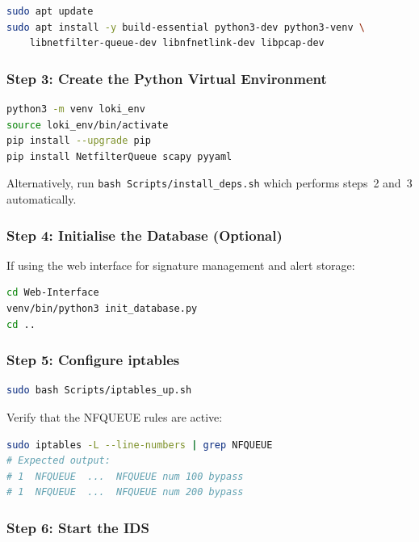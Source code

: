 \documentclass[12pt,a4paper]{article}
\begin{document}
\begin{lstlisting}[language=bash]
sudo apt update
sudo apt install -y build-essential python3-dev python3-venv \
    libnetfilter-queue-dev libnfnetlink-dev libpcap-dev
\end{lstlisting}

\subsubsection*{Step 3: Create the Python Virtual Environment}

\begin{lstlisting}[language=bash]
python3 -m venv loki_env
source loki_env/bin/activate
pip install --upgrade pip
pip install NetfilterQueue scapy pyyaml
\end{lstlisting}

Alternatively, run \texttt{bash Scripts/install\_deps.sh} which performs steps~2 and~3 automatically.

\subsubsection*{Step 4: Initialise the Database (Optional)}

If using the web interface for signature management and alert storage:

\begin{lstlisting}[language=bash]
cd Web-Interface
venv/bin/python3 init_database.py
cd ..
\end{lstlisting}

\subsubsection*{Step 5: Configure iptables}

\begin{lstlisting}[language=bash]
sudo bash Scripts/iptables_up.sh
\end{lstlisting}

Verify that the NFQUEUE rules are active:

\begin{lstlisting}[language=bash]
sudo iptables -L --line-numbers | grep NFQUEUE
# Expected output:
# 1  NFQUEUE  ...  NFQUEUE num 100 bypass
# 1  NFQUEUE  ...  NFQUEUE num 200 bypass
\end{lstlisting}

\subsubsection*{Step 6: Start the IDS}
\end{document}
